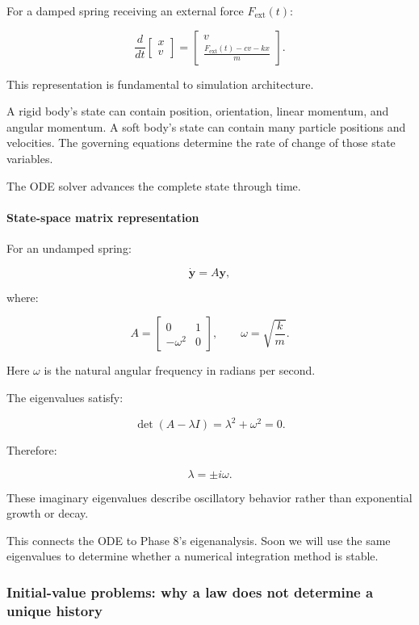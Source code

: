 For a damped spring receiving an external force \(F_{\mathrm{ext}}(t)\):

\[
\boxed{ \frac{d}{dt} \begin{bmatrix} x\\v \end{bmatrix} = \begin{bmatrix} v\\ \frac{F_{\mathrm{ext}}(t)-cv-kx}{m} \end{bmatrix} }.
\]

This representation is fundamental to simulation architecture.

A rigid body's state can contain position, orientation, linear momentum, and angular momentum. A soft body's state can contain many particle positions and velocities. The governing equations determine the rate of change of those state variables.

The ODE solver advances the complete state through time.

\paragraph{State-space matrix representation}\label{02-foundations-ii-ch022-state-space-matrix-representation}

For an undamped spring:

\[
\dot{\mathbf y}=A\mathbf y,
\]

where:

\[
\boxed{ A= \begin{bmatrix} 0&1\\ -\omega^2&0 \end{bmatrix}, \qquad \omega=\sqrt{\frac{k}{m}} }.
\]

Here \(\omega\) is the natural angular frequency in radians per second.

The eigenvalues satisfy:

\[
\det(A-\lambda I) = \lambda^2+\omega^2=0.
\]

Therefore:

\[
\lambda=\pm i\omega.
\]

These imaginary eigenvalues describe oscillatory behavior rather than exponential growth or decay.

This connects the ODE to Phase 8's eigenanalysis. Soon we will use the same eigenvalues to determine whether a numerical integration method is stable.

\subsubsection{Initial-value problems: why a law does not determine a unique history}\label{02-foundations-ii-ch022-initial-value-problems-why-a-law-does-not-determine-a-unique-history}

